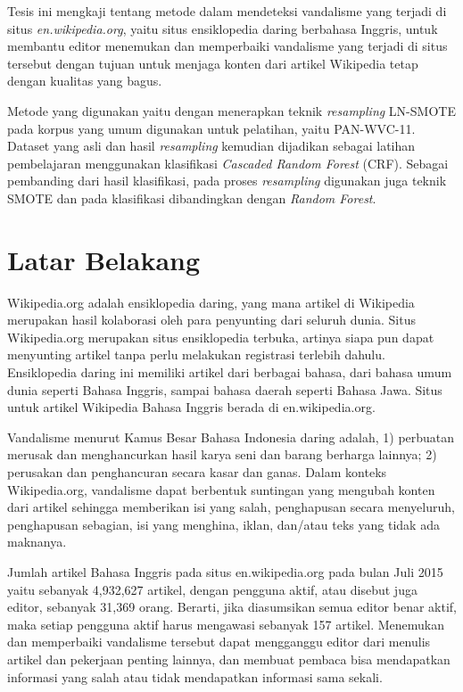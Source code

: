\documentclass[12pt,a4paper,titlepage]{article}
\begin{document}
Tesis ini mengkaji tentang metode dalam mendeteksi vandalisme yang terjadi di situs \textit{en.wikipedia.org}, yaitu situs ensiklopedia daring berbahasa Inggris, untuk membantu editor menemukan dan memperbaiki vandalisme yang terjadi di situs tersebut dengan tujuan untuk menjaga konten dari artikel Wikipedia tetap dengan kualitas yang bagus.

Metode yang digunakan yaitu dengan menerapkan teknik \textit{resampling} LN-SMOTE pada korpus yang umum digunakan untuk pelatihan, yaitu PAN-WVC-11.
Dataset yang asli dan hasil \textit{resampling} kemudian dijadikan sebagai latihan pembelajaran menggunakan klasifikasi \textit{Cascaded Random Forest} (CRF).
Sebagai pembanding dari hasil klasifikasi, pada proses \textit{resampling} digunakan juga teknik SMOTE dan pada klasifikasi dibandingkan dengan \textit{Random Forest}.


\section{Latar Belakang}\label{sec:latar-belakang}

Wikipedia.org adalah ensiklopedia daring, yang mana artikel di Wikipedia merupakan hasil kolaborasi oleh para penyunting dari seluruh dunia.
Situs Wikipedia.org merupakan situs ensiklopedia terbuka, artinya siapa pun dapat menyunting artikel tanpa perlu melakukan registrasi terlebih dahulu.
Ensiklopedia daring ini memiliki artikel dari berbagai bahasa, dari bahasa umum dunia seperti Bahasa Inggris, sampai bahasa daerah seperti Bahasa Jawa.
Situs untuk artikel Wikipedia Bahasa Inggris berada di en.wikipedia.org.

Vandalisme menurut Kamus Besar Bahasa Indonesia daring adalah, 1) perbuatan merusak dan menghancurkan hasil karya seni dan barang berharga lainnya; 2) perusakan dan penghancuran secara kasar dan ganas.
Dalam konteks Wikipedia.org, vandalisme dapat berbentuk suntingan yang mengubah konten dari artikel sehingga memberikan isi yang salah, penghapusan secara menyeluruh, penghapusan sebagian, isi yang menghina, iklan, dan/atau teks yang tidak ada maknanya.

Jumlah artikel Bahasa Inggris pada situs en.wikipedia.org pada bulan Juli 2015 yaitu sebanyak 4,932,627 artikel, dengan pengguna aktif, atau disebut juga editor, sebanyak 31,369 orang.
Berarti, jika diasumsikan semua editor benar aktif, maka setiap pengguna aktif harus mengawasi sebanyak 157 artikel.
Menemukan dan memperbaiki vandalisme tersebut dapat mengganggu editor dari menulis artikel dan pekerjaan penting lainnya, dan membuat pembaca bisa mendapatkan informasi yang salah atau tidak mendapatkan informasi sama sekali.
\end{document}
